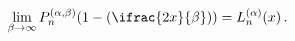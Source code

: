 \[\lim_{\beta\to\infty}\mathop{P^{(\alpha,\beta)}_{n}\/}\nolimits\!\left(1-(%
\ifrac{2x}{\beta})\right)=\mathop{L^{(\alpha)}_{n}\/}\nolimits\!\left(x\right).\]